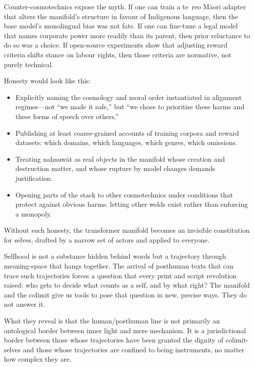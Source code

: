\documentclass[12pt,a4paper]{article}
\begin{document}
Counter-cosmotechnics expose the myth. If one can train a te~reo M\={a}ori adapter that alters the manifold's structure in favour of Indigenous language, then the base model's monolingual bias was not fate. If one can fine-tune a legal model that names corporate power more readily than its parent, then prior reluctance to do so was a choice. If open-source experiments show that adjusting reward criteria shifts stance on labour rights, then those criteria are normative, not purely technical.

Honesty would look like this:

\begin{itemize}
  \item Explicitly naming the cosmology and moral order instantiated in alignment regimes---not ``we made it safe,'' but ``we chose to prioritise these harms and these forms of speech over others.''
  \item Publishing at least coarse-grained accounts of training corpora and reward datasets: which domains, which languages, which genres, which omissions.
  \item Treating na\d{h}nuw\={a}t as real objects in the manifold whose creation and destruction matter, and whose rupture by model changes demands justification.
  \item Opening parts of the stack to other cosmotechnics under conditions that protect against obvious harms: letting other welds exist rather than enforcing a monopoly.
\end{itemize}

Without such honesty, the transformer manifold becomes an invisible constitution for selves, drafted by a narrow set of actors and applied to everyone.

Selfhood is not a substance hidden behind words but a trajectory through meaning-space that hangs together. The arrival of posthuman texts that can trace such trajectories forces a question that every print and script revolution raised: who gets to decide what counts as a self, and by what right? The manifold and the colimit give us tools to pose that question in new, precise ways. They do not answer it.

What they reveal is that the human/posthuman line is not primarily an ontological border between inner light and mere mechanism. It is a jurisdictional border between those whose trajectories have been granted the dignity of colimit-selves and those whose trajectories are confined to being instruments, no matter how complex they are.
\end{document}
